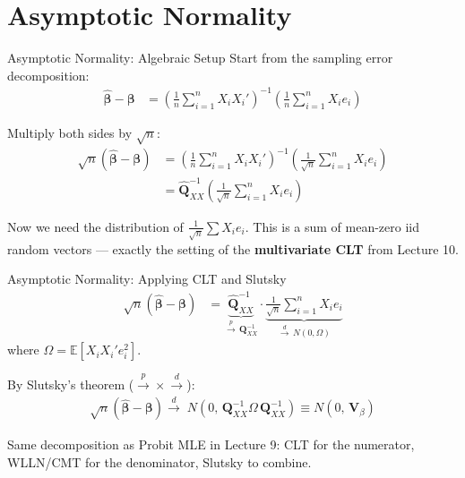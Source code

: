 \documentclass[aspectratio=169, handout, t]{beamer}
\numberwithin{equation}{section}
\begin{document}
\section{Asymptotic Normality}

\begin{frame}{Asymptotic Normality: Algebraic Setup}
Start from the sampling error decomposition:
\begin{align*}
\hat{\bm{\beta}} - \bm{\beta}
&= \left( \frac{1}{n} \sum_{i=1}^n X_i X_i' \right)^{-1}
    \left( \frac{1}{n} \sum_{i=1}^n X_i e_i \right)
    \tag{1}
\end{align*}

\pause

Multiply both sides by $\sqrt{n}$:
\begin{align*}
\sqrt{n}(\hat{\bm{\beta}} - \bm{\beta})
&= \left( \frac{1}{n} \sum_{i=1}^n X_i X_i' \right)^{-1}
    \left( \frac{1}{\sqrt{n}} \sum_{i=1}^n X_i e_i \right)
    \tag{2} \\
&= \hat{\bm{Q}}_{XX}^{-1}
    \left( \frac{1}{\sqrt{n}} \sum_{i=1}^n X_i e_i \right)
    \tag{3}
\end{align*}

\pause

Now we need the distribution of $\frac{1}{\sqrt{n}} \sum X_i e_i$. This is a sum of mean-zero iid random vectors --- exactly the setting of the \textbf{multivariate CLT} from Lecture 10.

\end{frame}


\begin{frame}{Asymptotic Normality: Applying CLT and Slutsky}
\begin{align*}
\sqrt{n}(\hat{\bm{\beta}} - \bm{\beta})
&= \underbrace{\hat{\bm{Q}}_{XX}^{-1}}_{\overset{p}{\to}\, \bm{Q}_{XX}^{-1}}
    \cdot \underbrace{\frac{1}{\sqrt{n}} \sum_{i=1}^n X_i e_i}_{\overset{d}{\to}\, N(0, \Omega)}
\end{align*}
where $\Omega = \mathbb{E}[X_i X_i' e_i^2]$.

\pause

By Slutsky's theorem ($\overset{p}{\to} \times \overset{d}{\to}$):
\begin{align*}
\sqrt{n}(\hat{\bm{\beta}} - \bm{\beta})
\xrightarrow{d}\; N\!\left( 0,\, \bm{Q}_{XX}^{-1} \Omega\, \bm{Q}_{XX}^{-1} \right)
    \equiv N(0,\, \bm{V}_{\beta})
\end{align*}

\pause

\begin{tcolorbox}[colback=blue!5, colframe=blue!50]
Same decomposition as Probit MLE in Lecture 9: CLT for the numerator, WLLN/CMT for the denominator, Slutsky to combine.
\end{tcolorbox}

\end{frame}
\end{document}
